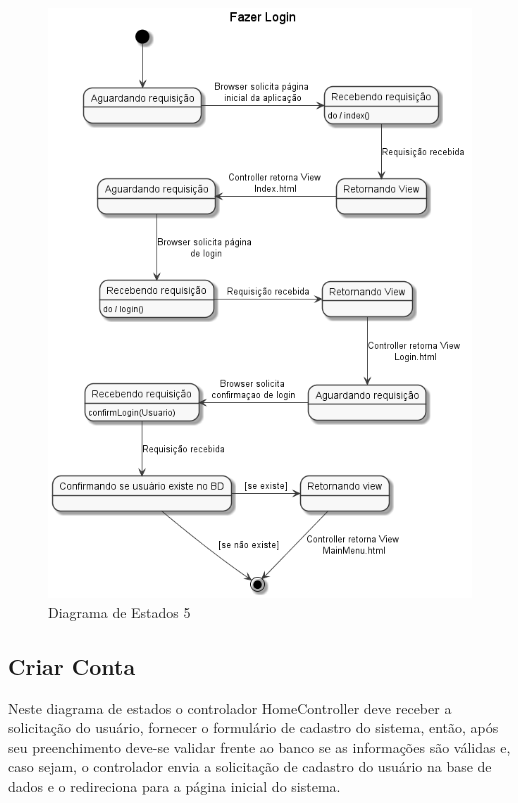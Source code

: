 \documentclass[rascunho,xindy,acronym,symbols]{fei}
\begin{document}
\begin{figure}[H]
    \centering
    \includegraphics[scale=0.6, width=350pt]{./Images/DE_-_Fazer_Login.png}
    \caption{Diagrama de Estados 5}
    \label{fig:diag_est5}
\end{figure}

\subsection{Criar Conta}

Neste diagrama de estados o controlador HomeController deve receber a solicitação do usuário, fornecer o formulário de cadastro do sistema, então, após seu preenchimento deve-se validar frente ao banco se as informações são válidas e, caso sejam, o controlador envia a solicitação de cadastro do usuário na base de dados e o redireciona para a página inicial do sistema.
\end{document}
